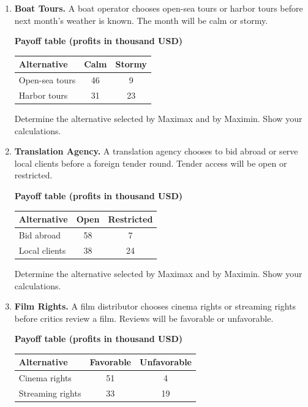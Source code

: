 \setlength{\tabcolsep}{10pt}
\renewcommand{\arraystretch}{1.2}
\linespread{1.0}\selectfont
\begin{enumerate}[leftmargin=0.25in, itemsep=0pt, parsep=3pt]

\item \textbf{Boat Tours.} A boat operator chooses open-sea tours or harbor tours before next month's weather is known. The month will be calm or stormy.

\begin{center}
\textbf{Payoff table (profits in thousand USD)}\\[3pt]
\begin{tabular}{lcc}
\toprule
Alternative & Calm & Stormy \\
\midrule
Open-sea tours  & 46 & 9 \\
Harbor tours & 31 & 23 \\
\bottomrule
\end{tabular}
\end{center}

Determine the alternative selected by Maximax and by Maximin. Show your calculations.
\par\vfill

\item \textbf{Translation Agency.} A translation agency chooses to bid abroad or serve local clients before a foreign tender round. Tender access will be open or restricted.

\begin{center}
\textbf{Payoff table (profits in thousand USD)}\\[3pt]
\begin{tabular}{lcc}
\toprule
Alternative & Open  & Restricted  \\
\midrule
Bid abroad & 58 & 7 \\
Local clients & 38 & 24 \\
\bottomrule
\end{tabular}
\end{center}

Determine the alternative selected by Maximax and by Maximin. Show your calculations.
\par\vfill

\item \textbf{Film Rights.} A film distributor chooses cinema rights or streaming rights before critics review a film. Reviews will be favorable or unfavorable.

\begin{center}
\textbf{Payoff table (profits in thousand USD)}\\[3pt]
\begin{tabular}{lcc}
\toprule
Alternative & Favorable & Unfavorable \\
\midrule
Cinema rights & 51 & 4 \\
Streaming rights & 33 & 19 \\
\bottomrule
\end{tabular}
\end{center}


\end{enumerate}

